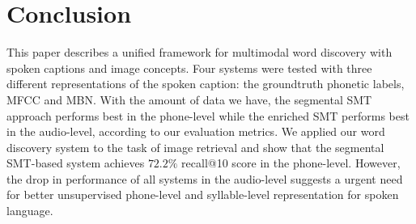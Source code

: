\documentclass[journal]{IEEEtran}
\begin{document}

\section{Conclusion}
This paper describes a unified framework for multimodal word discovery with spoken captions and image concepts. Four systems were tested with three different representations of the spoken caption: the groundtruth phonetic labels, MFCC and MBN. With the amount of data we have, the segmental SMT approach performs best in the phone-level while the enriched SMT performs best in the audio-level, according to our evaluation metrics. We applied our word discovery system to the task of image retrieval and show that the segmental SMT-based system achieves $72.2 \%$ recall@10 score in the phone-level. However, the drop in performance of all systems in the audio-level suggests a urgent need for better unsupervised phone-level and syllable-level representation for spoken language.  






%
\end{document}
